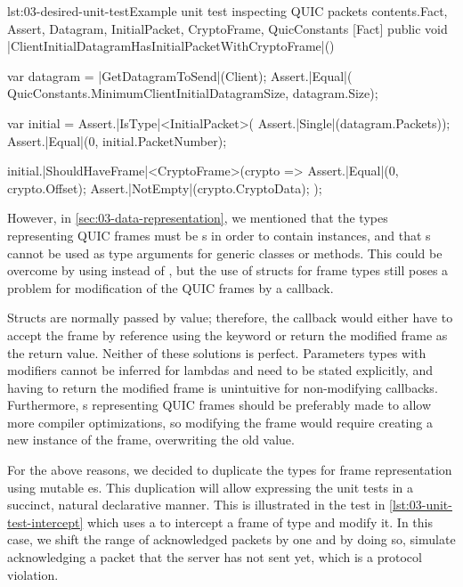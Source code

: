 \begin{myListingCsharp}{lst:03-desired-unit-test}{Example unit test inspecting QUIC packets contents.}{Fact, Assert, Datagram, InitialPacket, CryptoFrame, QuicConstants}{}
    [Fact]
    public void |ClientInitialDatagramHasInitialPacketWithCryptoFrame|()
    {
        var datagram = |GetDatagramToSend|(Client);
        Assert.|Equal|(
            QuicConstants.MinimumClientInitialDatagramSize,
            datagram.Size);

        var initial = Assert.|IsType|<InitialPacket>(
            Assert.|Single|(datagram.Packets));
        Assert.|Equal|(0, initial.PacketNumber);

        initial.|ShouldHaveFrame|<CryptoFrame>(crypto =>
        {
            Assert.|Equal|(0, crypto.Offset);
            Assert.|NotEmpty|(crypto.CryptoData);
        });
    }
\end{myListingCsharp}

However, in \autoref{sec:03-data-representation}, we mentioned that the types representing QUIC
frames must be s in order to contain  instances, and that
s cannot be used as type arguments for generic classes or methods. This could be
overcome by using  instead of , but the use of structs for frame
types still poses a problem for modification of the QUIC frames by a callback.

Structs are normally passed by value; therefore, the callback would either have to accept the frame
by reference using the  keyword or return the modified frame as the return value.
Neither of these solutions is perfect. Parameters types with  modifiers cannot be
inferred for lambdas and need to be stated explicitly, and having to return the modified frame is
unintuitive for non-modifying callbacks. Furthermore, s representing QUIC frames
should be preferably made  to allow more compiler optimizations, so modifying the
frame would require creating a new instance of the frame, overwriting the old value.

For the above reasons, we decided to duplicate the types for frame representation using mutable
es. This duplication will allow expressing the unit tests in a succinct, natural
declarative manner. This is illustrated in the test in \autoref{lst:03-unit-test-intercept} which
uses a  to intercept a frame of type  and
modify it. In this case, we shift the range of acknowledged packets by one and by doing so, simulate
acknowledging a packet that the server has not sent yet, which is a protocol violation.

